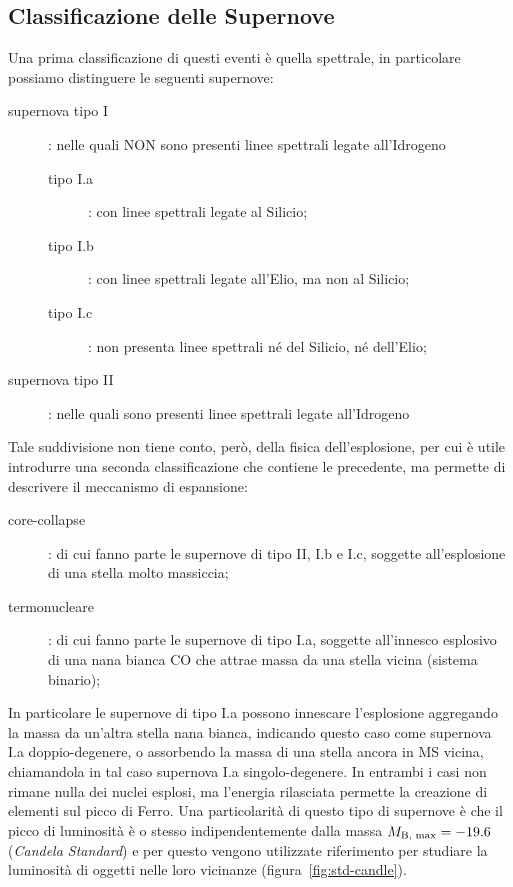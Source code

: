 \subsection{Classificazione delle Supernove} \label{sec:calss-supernove}

Una prima classificazione di questi eventi è quella spettrale, in particolare possiamo distinguere le seguenti supernove:
\begin{description}
    \item[supernova tipo I]: nelle quali NON sono presenti linee spettrali legate all'Idrogeno
    \begin{description}
        \item[tipo I.a]: con linee spettrali legate al Silicio;
        \item[tipo I.b]: con linee spettrali legate all'Elio, ma non al Silicio;
        \item[tipo I.c]: non presenta linee spettrali né del Silicio, né dell'Elio;
    \end{description}
    \item[supernova tipo II]: nelle quali sono presenti linee spettrali legate all'Idrogeno
\end{description}

Tale suddivisione non tiene conto, però, della fisica dell'esplosione, per cui è utile introdurre una seconda classificazione che contiene le precedente, ma permette di descrivere il meccanismo di espansione:
\begin{description}
    \item[core-collapse]: di cui fanno parte le supernove di tipo II, I.b e I.c, soggette all'esplosione di una stella molto massiccia;
    \item[termonucleare]: di cui fanno parte le supernove di tipo I.a, soggette all'innesco esplosivo di una nana bianca CO che attrae massa da una stella vicina (sistema binario);
\end{description}

In particolare le supernove di tipo I.a possono innescare l'esplosione aggregando la massa da un'altra stella nana bianca, indicando questo caso come supernova I.a doppio-degenere, o assorbendo la massa di una stella ancora in MS vicina, chiamandola in tal caso supernova I.a singolo-degenere. In entrambi i casi non rimane nulla dei nuclei esplosi, ma l'energia rilasciata permette la creazione di elementi sul picco di Ferro. Una particolarità di questo tipo di supernove è che il picco di luminosità è o stesso indipendentemente dalla massa $M_{\mbox{\scriptsize{B, max}}} = - 19.6$ (\textit{Candela Standard}) e per questo vengono utilizzate riferimento per studiare la luminosità di oggetti nelle loro vicinanze (figura~\ref{fig:std-candle}).

